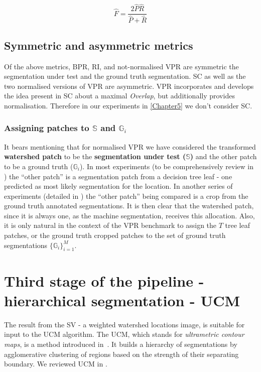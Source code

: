 \[
\hat{{F}}=\frac{2\hat{P}\hat{R}}{\hat{P}+\hat{R}}
\]

\subsection{Symmetric and asymmetric metrics}
Of the above metrics, BPR, RI, and not-normalised VPR are symmetric \wrt the segmentation under test and the ground truth segmentation. SC as well as the two normalised versions of VPR are asymmetric. VPR incorporates and develops the idea present in SC about a maximal \textit{Overlap}, but additionally provides normalisation. Therefore in our experiments in \cref{Chapter5} we don't consider SC.


\subsubsection{Assigning patches to \texorpdfstring{$\mathbb{S}$}{S} and \texorpdfstring{$\mathbb{G}_i$}{G}}
It bears mentioning %
that for normalised VPR we have considered the transformed \textbf{watershed patch} to be the \textbf{segmentation under test ($\mathbb{S}$)} and the other patch to be a ground truth ($\mathbb{G}_i$). 
In most experiments (to be comprehensively %
review in ) the ``other patch'' is a segmentation patch from a decision tree leaf - one predicted as most likely segmentation for the location. In another series of experiments (detailed in ) the ``other patch'' being compared is a crop from the ground truth annotated segmentations.
It is then clear that the watershed patch, since it is always one, as the machine segmentation, receives this allocation. Also, it is only natural in the context of the VPR benchmark to assign the $T$ tree leaf patches, or the ground truth cropped patches to the set of ground truth segmentations $\{\mathbb{G}_i\}_{i=1}^M$.

\section[Third stage of the pipeline - UCM]{Third stage of the pipeline - hierarchical segmentation - UCM}
The result from the SV - a weighted watershed locations image, is suitable for input to the UCM algorithm. The UCM, which stands for {\it ultrametric contour maps}, is a method introduced in~\cite{Arbelaez2006boundary}. It builds a hierarchy of segmentations by agglomerative clustering of regions based on the strength of their separating boundary. We reviewed UCM in . 

